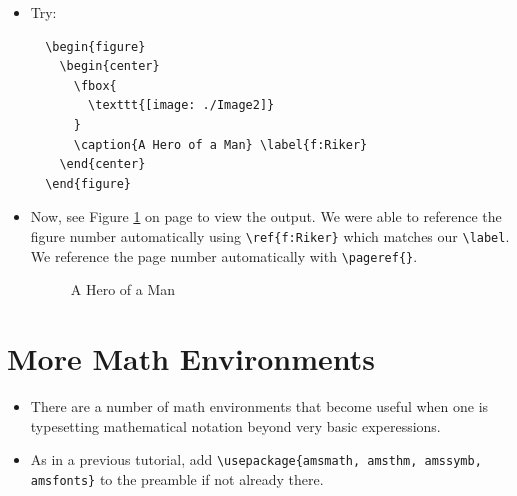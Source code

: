 \begin{itemize}
\item Try: \\
\begin{lstlisting}
  \begin{figure}
    \begin{center}
      \fbox{
        \texttt{[image: ./Image2]}
      }
      \caption{A Hero of a Man} \label{f:Riker}
    \end{center}
  \end{figure}
\end{lstlisting}

\item Now, see Figure \ref{f:Riker} on page \pageref{f:Riker} to view the
  output. We were able to reference the figure number automatically using
  \verb!\ref{f:Riker}! which matches our \verb!\label!. We reference the page
  number automatically with \verb!\pageref{}!.
  \\

\begin{figure}
  \begin{center}
    \caption{A Hero of a Man} \label{f:Riker}
  \end{center}
\end{figure}

\end{itemize}

\section*{More Math Environments}

\begin{itemize}

\item There are a number of math environments that become useful when one is
  typesetting mathematical notation beyond very basic experessions.

\item As in a previous tutorial, add
  \verb!\usepackage{amsmath, amsthm, amssymb, amsfonts}! to the preamble if not
  already there.

\end{itemize}


